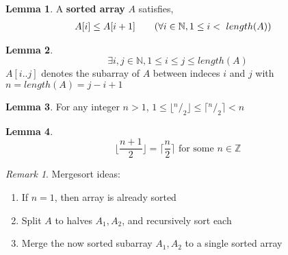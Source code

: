 \documentclass[11pt]{article}
\theoremstyle{plain}%
\theoremstyle{definition}
\newtheorem{lemma}{Lemma}[defn]
\theoremstyle{remark}
\newtheorem*{rem}{Remark}
\newcommand*\rfrac[2]{{}^{#1}\!/_{#2}}
\newcommand{\N}{\mathbb{N}}
\begin{document}
\begin{lemma}
  \label{sorting algorithm}
  A \textbf{sorted array} $A$ satisfies,
  \begin{align*}
    A[i] &\leq A[i+1] \tag{$\forall i\in \N, 1\leq i < \text{ }length(A)$}
  \end{align*}
\end{lemma}

\begin{lemma}
  \[
    \exists i,j\in \N, 1\leq i\leq j\leq length(A)
  \]
   $A[i..j]$ denotes the subarray of $A$ between indeces $i$ and $j$ with $n = length(A) = j-i + 1 $
\end{lemma}

\begin{lemma}
  For any integer $n>1$, $1\leq \lfloor \rfrac{n}{2}\rfloor \leq \lceil \rfrac{n}{2}\rceil < n$
\end{lemma}

\begin{lemma}
  \[
    \lfloor \frac{n+1}{2} \rfloor = \lceil \frac{n}{2} \rceil \text{ for some $n\in \mathbb{Z}$}
  \]
\end{lemma}


\begin{rem}
  Mergesort ideas:
  \begin{enumerate}
    \item If $n=1$, then array is already sorted
    \item Split $A$ to halves $A_1, A_2$, and recursively sort each
    \item Merge the now sorted subarray $A_1, A_2$ to a single sorted array
  \end{enumerate}
\end{rem}
\end{document}

